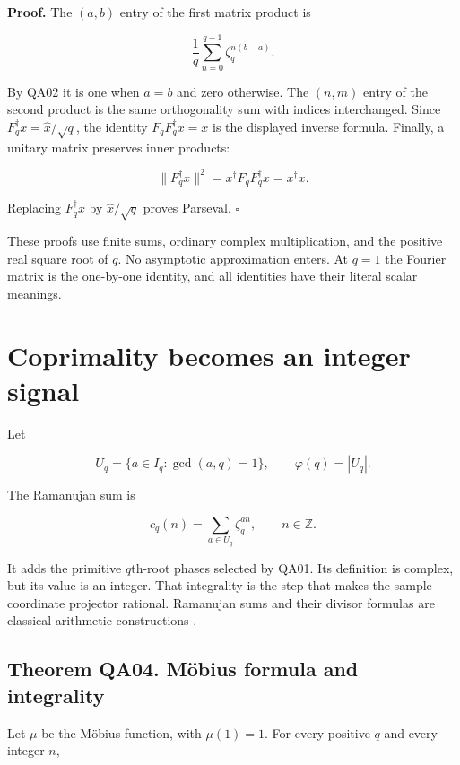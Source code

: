 \textbf{Proof.} The \((a,b)\) entry of the first matrix product is

\[
\frac1q\sum_{n=0}^{q-1}\zeta_q^{n(b-a)}.
\]

By QA02 it is one when \(a=b\) and zero otherwise. The \((n,m)\) entry
of the second product is the same orthogonality sum with indices
interchanged. Since \(F_q^\dagger x=\widehat{x}/\sqrt q\), the identity
\(F_qF_q^\dagger x=x\) is the displayed inverse formula. Finally, a
unitary matrix preserves inner products:

\[
\|F_q^\dagger x\|^2
=x^\dagger F_qF_q^\dagger x
=x^\dagger x.
\]

Replacing \(F_q^\dagger x\) by \(\widehat{x}/\sqrt q\) proves Parseval.
\(\square\)

These proofs use finite sums, ordinary complex multiplication, and the
positive real square root of \(q\). No asymptotic approximation enters.
At \(q=1\) the Fourier matrix is the one-by-one identity, and all
identities have their literal scalar meanings.

\hypertarget{q:coprimality-becomes-an-integer-signal}{%
\section{Coprimality becomes an integer
signal}\label{q:coprimality-becomes-an-integer-signal}}

Let

\[
U_q=\{a\in I_q:\gcd(a,q)=1\},
\qquad \varphi(q)=|U_q|.
\]

The Ramanujan sum is

\[
c_q(n)=\sum_{a\in U_q}\zeta_q^{an},
\qquad n\in\mathbb Z.
\]

It adds the primitive \(q\)th-root phases selected by QA01. Its
definition is complex, but its value is an integer. That integrality is
the step that makes the sample-coordinate projector rational. Ramanujan
sums and their divisor formulas are classical arithmetic constructions
\cite{q:Ramanujan1918}.

\hypertarget{q:theorem-qa04.-muxf6bius-formula-and-integrality}{%
\subsection*{Theorem QA04. Möbius formula and
integrality}\label{q:theorem-qa04.-muxf6bius-formula-and-integrality}}

Let \(\mu\) be the Möbius function, with \(\mu(1)=1\). For every
positive \(q\) and every integer \(n\),

